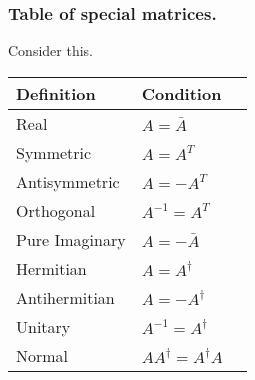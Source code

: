\documentclass[../main.tex]{subfiles}
\begin{document}
\subsubsection*{Table of special matrices.} Consider this.

\begin{table}[h]
    \centering
    \begin{tabular}{@{}llr@{}} 
        \toprule
        Definition & Condition  \\ 
        \midrule
        Real & $A=\bar{A}$  \\  
        Symmetric & $A=A^T$ \\     
        Antisymmetric & $A=-A^T$ \\
        Orthogonal & $A^{-1}=A^T$ \\
        Pure Imaginary & $A=-\bar{A}$ \\
        Hermitian & $A=A^{\dagger}$ \\
        Antihermitian & $A=-A^{\dagger}$\\
        Unitary & $A^{-1}=A^{\dagger}$\\
        Normal & $AA^{\dagger}=A^{\dagger}A$\\
        \bottomrule
    \end{tabular}
\end{table}
\end{document}
